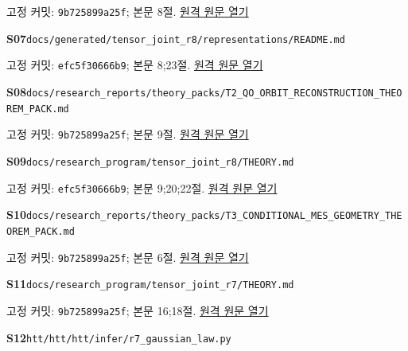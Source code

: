 \documentclass[11pt,a4paper]{article}
\begin{document}
{\small 고정 커밋: \texttt{9b725899a25f}; 본문 8절. \href{https://github.com/cosmosapjw-quantum/htt_base/blob/9b725899a25fa410e7c3686ce36afaa667d14646/docs/research_reports/theory_packs/T1_STORED_REAL_STF_THEOREM_PACK.md}{원격 원문 열기}}\par
\hypertarget{src:S07}{}\textbf{S07}\quad \nolinkurl{docs/generated/tensor_joint_r8/representations/README.md}\par
{\small 고정 커밋: \texttt{efc5f30666b9}; 본문 8;23절. \href{https://github.com/cosmosapjw-quantum/htt_base/blob/efc5f30666b96782f946375551f0068bb3a30f74/docs/generated/tensor_joint_r8/representations/README.md}{원격 원문 열기}}\par
\hypertarget{src:S08}{}\textbf{S08}\quad \nolinkurl{docs/research_reports/theory_packs/T2_QO_ORBIT_RECONSTRUCTION_THEOREM_PACK.md}\par
{\small 고정 커밋: \texttt{9b725899a25f}; 본문 9절. \href{https://github.com/cosmosapjw-quantum/htt_base/blob/9b725899a25fa410e7c3686ce36afaa667d14646/docs/research_reports/theory_packs/T2_QO_ORBIT_RECONSTRUCTION_THEOREM_PACK.md}{원격 원문 열기}}\par
\hypertarget{src:S09}{}\textbf{S09}\quad \nolinkurl{docs/research_program/tensor_joint_r8/THEORY.md}\par
{\small 고정 커밋: \texttt{efc5f30666b9}; 본문 9;20;22절. \href{https://github.com/cosmosapjw-quantum/htt_base/blob/efc5f30666b96782f946375551f0068bb3a30f74/docs/research_program/tensor_joint_r8/THEORY.md}{원격 원문 열기}}\par
\hypertarget{src:S10}{}\textbf{S10}\quad \nolinkurl{docs/research_reports/theory_packs/T3_CONDITIONAL_MES_GEOMETRY_THEOREM_PACK.md}\par
{\small 고정 커밋: \texttt{9b725899a25f}; 본문 6절. \href{https://github.com/cosmosapjw-quantum/htt_base/blob/9b725899a25fa410e7c3686ce36afaa667d14646/docs/research_reports/theory_packs/T3_CONDITIONAL_MES_GEOMETRY_THEOREM_PACK.md}{원격 원문 열기}}\par
\hypertarget{src:S11}{}\textbf{S11}\quad \nolinkurl{docs/research_program/tensor_joint_r7/THEORY.md}\par
{\small 고정 커밋: \texttt{9b725899a25f}; 본문 16;18절. \href{https://github.com/cosmosapjw-quantum/htt_base/blob/9b725899a25fa410e7c3686ce36afaa667d14646/docs/research_program/tensor_joint_r7/THEORY.md}{원격 원문 열기}}\par
\hypertarget{src:S12}{}\textbf{S12}\quad \nolinkurl{htt/htt/htt/infer/r7_gaussian_law.py}\par
\end{document}
